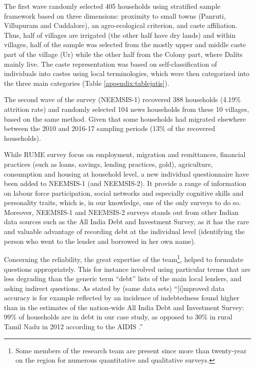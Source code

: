 \documentclass[a4paper, 11pt, onecolumn]{article}
\begin{document}
The first wave randomly selected 405 households using stratified sample framework based on three dimensions: proximity to small towns (Panruti, Villupuram and Cuddalore), an agro-ecological criterion, and caste affiliation.
Thus, half of villages are irrigated (the other half have dry lands) and within villages, half of the sample was selected from the mostly upper and middle caste part of the village (Ur) while the other half from the Colony part, where Dalits mainly live.
The caste representation was based on self-classification of individuals into castes using local terminologies, which were then categorized into the three main categories (Table \ref{appendix:tablejatis}).

The second wave of the survey (NEEMSIS-1) recovered 388 households (4.19\% attrition rate) and randomly selected 104 news households from these 10 villages, based on the same method. 
Given that some households had migrated elsewhere between the 2010 and 2016-17 sampling periods (13\% of the recovered households).

 
While RUME survey focus on employment, migration and remittances, financial practices (such as loans, savings, lending practices, gold), agriculture, consumption and housing at household level, a new individual questionnaire have been added to NEEMSIS-1 (and NEEMSIS-2).
It provide a range of information on labour force participation, social networks and especially cognitive skills and personality traits, which is, in our knowledge, one of the only surveys to do so.
Moreover, NEEMSIS-1 and NEEMSIS-2 surveys stands out from other Indian data sources such as the All India Debt and Investment Survey, as it has the rare and valuable advantage of recording debt at the individual level (identifying the person who went to the lender and borrowed in her own name).

Concerning the reliability, the great expertise of the team\footnote{Some members of the research team are present since more than twenty-year on the region for numerous quantitative and qualitative surveys.}, helped to formulate questions appropriately.
This for instance involved using particular terms that are less degrading than the generic term ``debt'' lists of the main local lenders, and asking indirect questions.
As stated by \cite{Reboul2021} (same data sets) ``[i]mproved data accuracy is for example reflected by an incidence of indebtedness found higher than in the estimates of the nation-wide All India Debt and Investment Survey: 99\% of households are in debt in our case study, as opposed to 30\% in rural Tamil Nadu in 2012 according to the AIDIS \citep{NSSO2014}.'' 
\end{document}
